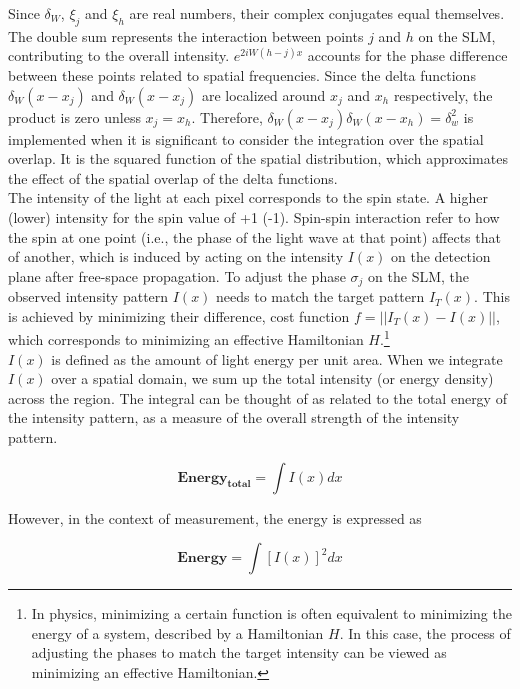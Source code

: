 Since $\delta_W$, $\xi_j$ and $\xi_h$ are real numbers, their complex conjugates equal themselves. The double sum represents the interaction between points $j$ and $h$ on the SLM, contributing to the overall intensity. $e^{2iW(h-j)x}$ accounts for the phase difference between these points related to spatial frequencies. Since the delta functions $\delta_W(x-x_j)$  and $\delta_W(x-x_j)$ are localized around $x_j$ and $x_h$ respectively, the product is zero unless $x_j = x_h$. Therefore, $\delta_W(x-x_j) \delta_W(x-x_h) = \delta_w^2$ is implemented when it is significant to consider the integration over the spatial overlap. It is the squared function of the spatial distribution, which approximates the effect of the spatial overlap of the delta functions.\\

The intensity of the light at each pixel corresponds to the spin state. A higher (lower) intensity for the spin value of +1 (-1). Spin-spin interaction refer to how the spin at one point (i.e., the phase of the light wave at that point) affects that of another, which is induced by acting on the intensity $I(x)$ on the detection plane after free-space propagation. To adjust the phase $\sigma_j$ on the SLM, the observed intensity pattern $I(x)$ needs to match the target pattern $I_T(x)$. This is achieved by minimizing their difference, cost function $f = ||I_T(x) - I(x)||$, which corresponds to minimizing an effective Hamiltonian $H$.\footnote{In physics, minimizing a certain function is often equivalent to minimizing the energy of a system, described by a Hamiltonian $H$. In this case, the process of adjusting the phases to match the target intensity can be viewed as minimizing an effective Hamiltonian.} \\

$I(x)$ is defined as the amount of light energy per unit area. When we integrate $I(x)$ over a spatial domain, we sum up the total intensity (or energy density) across the region. The integral can be thought of as related to the total energy of the intensity pattern, as a measure of the overall strength of the intensity pattern. 

\begin{equation}
\textbf{Energy}_{\textbf{total}} =  \int I(x) dx
\end{equation}

However, in the context of measurement, the energy is expressed as

\begin{equation}
\textbf{Energy} =  \int [I(x)]^2 dx
\end{equation}

